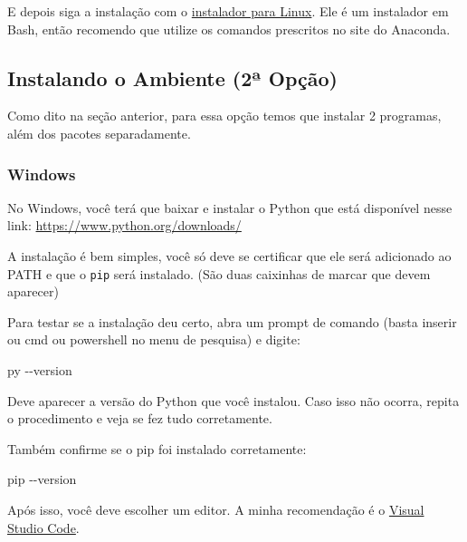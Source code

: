\documentclass[11pt, brazilian]{article}
\newenvironment{Shaded}{}{}
\newcommand{\ExtensionTok}[1]{{#1}}
\newcommand{\AttributeTok}[1]{\textcolor[rgb]{0.49,0.56,0.16}{{#1}}}
\begin{document}
E depois siga a instalação com o
\href{https://www.anaconda.com/download/\#linux}{instalador para Linux}.
Ele é um instalador em Bash, então recomendo que utilize os comandos
prescritos no site do Anaconda.

\hypertarget{instalando-o-ambiente-2uxaa-opuxe7uxe3o}{%
\subsection{Instalando o Ambiente (2ª
Opção)}\label{instalando-o-ambiente-2uxaa-opuxe7uxe3o}}

Como dito na seção anterior, para essa opção temos que instalar 2
programas, além dos pacotes separadamente.

\hypertarget{windows-1}{%
\subsubsection{Windows}\label{windows-1}}

No Windows, você terá que baixar e instalar o Python que está disponível
nesse link: \url{https://www.python.org/downloads/}

A instalação é bem simples, você só deve se certificar que ele será
adicionado ao PATH e que o \texttt{pip} será instalado. (São duas
caixinhas de marcar que devem aparecer)

Para testar se a instalação deu certo, abra um prompt de comando (basta
inserir ou cmd ou powershell no menu de pesquisa) e digite:

\begin{Shaded}
\begin{Highlighting}[]
\ExtensionTok{py} \AttributeTok{{-}{-}version}
\end{Highlighting}
\end{Shaded}

Deve aparecer a versão do Python que você instalou. Caso isso não
ocorra, repita o procedimento e veja se fez tudo corretamente.

Também confirme se o pip foi instalado corretamente:

\begin{Shaded}
\begin{Highlighting}[]
\ExtensionTok{pip} \AttributeTok{{-}{-}version}
\end{Highlighting}
\end{Shaded}

Após isso, você deve escolher um editor. A minha recomendação é o
\href{https://code.visualstudio.com/}{Visual Studio Code}.
\end{document}
